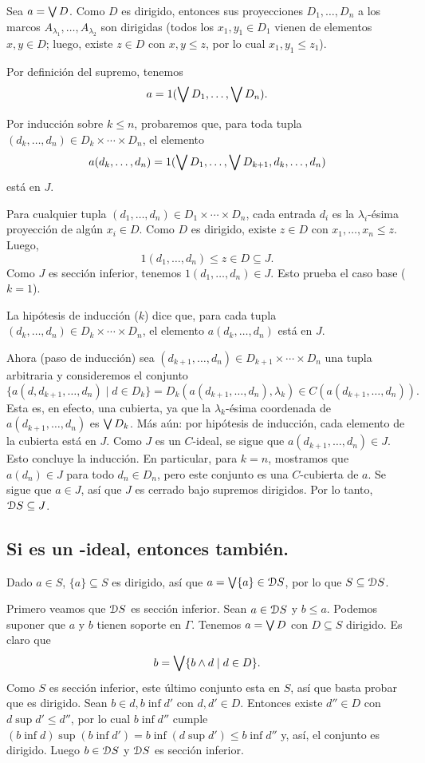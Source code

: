 Sea $a=\bigvee D$.
Como $D$ es dirigido, entonces sus proyecciones $D_1,\dots,D_n$ a
los marcos $A_{\lambda_1},\dots,A_{\lambda_2}$ son dirigidas
(todos los $x_1,y_1\in D_1$ vienen de elementos $x,y\in D$;
luego, existe $z\in D$ con $x,y\leq z$, por lo cual $x_1,y_1\leq
z_1$).

Por definición del supremo, tenemos
\[
  a = 1(\bigvee D_1,\dots,\bigvee D_n)
.\]

Por inducción sobre $k\leq n$, probaremos que, para toda tupla
$(d_k,\dots,d_n)\in D_k\times\cdots\times D_n$, el elemento
\[
  a(d_k,\dots,d_n)
  =
  1(\bigvee D_1,\dots,\bigvee D_{k+1},d_k,\dots,d_n)
\]
está en $J$.

Para cualquier tupla $(d_1,\dots,d_n)\in D_1\times\cdots\times
D_n$, cada entrada $d_i$ es la $\lambda_i$-ésima
proyección de algún $x_i\in D$.
Como $D$ es dirigido, existe $z\in D$ con $x_1,\dots,x_n\leq z$.
Luego,
\[
  1(d_1,\dots,d_n)\leq z\in D \subseteq J
.\]
Como $J$ es sección inferior, tenemos $1(d_1,\dots,d_n)\in J$.
Esto prueba el caso base ($k=1$).

La hipótesis de inducción ($k$) dice que, para cada tupla
$(d_k,\dots,d_n)\in D_k\times\cdots\times D_n$, el elemento
$a(d_k,\dots,d_n)$ está en $J$.

Ahora (paso de inducción) sea
$(d_{k+1},\dots,d_n)\in D_{k+1}\times\cdots\times D_n$ una tupla
arbitraria y consideremos el conjunto
\
\[
  \{a(d,d_{k+1},\dots,d_n) \mid d\in D_k\}
  =
  D_k(a(d_{k+1},\dots,d_n),\lambda_k)
  \in
  C(a(d_{k+1},\dots,d_n))
.\]
Esta es, en efecto, una cubierta, ya que la $\lambda_k$-ésima
coordenada de $a(d_{k+1},\dots,d_n)$ es $\bigvee D_k$.
Más aún: por hipótesis de inducción, cada elemento de la cubierta
está en $J$.
Como $J$ es un $C$-ideal, se sigue que
$a(d_{k+1},\dots,d_n)\in J$.
Esto concluye la inducción.
En particular, para $k=n$, mostramos que $a(d_n)\in J$ para todo
$d_n\in D_n$, pero este conjunto es una $C$-cubierta de $a$.
Se sigue que $a\in J$, así que $J$ es cerrado bajo supremos
dirigidos.
Por lo tanto, $\mathcal D S\subseteq J$.

\subsection{Si  es un -ideal,
entonces  también.}

Dado $a\in S$, $\{a\}\subseteq S$ es dirigido, así que
$a=\bigvee\{a\}\in \mathcal D S$, por lo que $S\subseteq\mathcal D S$.

Primero veamos que $\mathcal D S$ es sección inferior.
Sean $a\in \mathcal D S$ y $b\leq a$.
Podemos suponer que $a$ y $b$ tienen soporte en $\Gamma$.
Tenemos $a=\bigvee D$ con $D\subseteq S$ dirigido.
Es claro que
\[
  b = \bigvee\{b\wedge d\mid d\in D\}
.\]
Como $S$ es sección inferior, este último conjunto esta en $S$,
así que basta probar que es dirigido.
Sean $b\in d,b\inf d'$ con $d,d'\in D$.
Entonces existe $d''\in D$ con $d\sup d'\leq d''$, por lo
cual $b\inf d''$ cumple
$(b\inf d)\sup(b\inf d')=b\inf(d\sup d')\leq b\inf d''$ y, así,
el conjunto es dirigido.
Luego $b\in\mathcal D S$ y $\mathcal D S$ es sección inferior.

